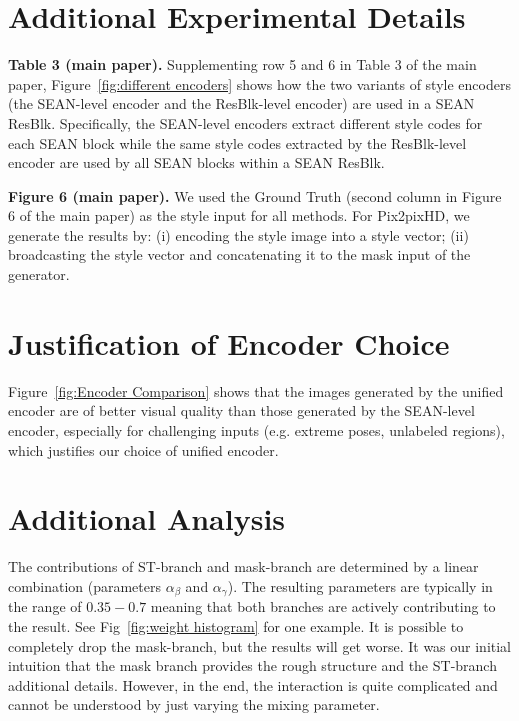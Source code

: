 \documentclass[10pt,twocolumn,letterpaper]{article}
\begin{document}
\section{Additional Experimental Details}


\noindent \textbf{Table 3 (main paper).}
Supplementing row 5 and 6 in Table 3 of the main paper, Figure~\ref{fig:different encoders} shows how the two variants of style encoders (\ie the SEAN-level encoder and the ResBlk-level encoder) are used in a SEAN ResBlk.
Specifically, the SEAN-level encoders extract different style codes for each SEAN block while the same style codes extracted by the ResBlk-level encoder are used by all SEAN blocks within a SEAN ResBlk. 



\vspace*{3mm}\noindent \textbf{Figure 6 (main paper).}
We used the Ground Truth (second column in Figure 6 of the main paper) as the style input for all methods.
For Pix2pixHD, we generate the results by: (i) encoding the style image into a style vector; (ii) broadcasting the style vector and concatenating it to the mask input of the generator. 


\section{Justification of Encoder Choice} Figure~\ref{fig:Encoder Comparison} shows that the images generated by the unified encoder are of better visual quality than those generated by the SEAN-level encoder, especially for challenging inputs (e.g. extreme poses, unlabeled regions), which justifies our choice of unified encoder. 




\section{Additional Analysis}
The contributions of ST-branch and mask-branch are determined by a linear combination (parameters $\alpha_\beta$ and $\alpha_\gamma$). The resulting parameters are typically in the range of $0.35 - 0.7$ meaning that both branches are actively contributing to the result. See Fig~\ref{fig:weight histogram} for one example.
It is possible to completely drop the mask-branch, but the results will get worse. 
It was our initial intuition that the mask branch provides the rough structure and the ST-branch additional details. However, in the end, the interaction is quite complicated and cannot be understood by just varying the mixing parameter.
\end{document}
